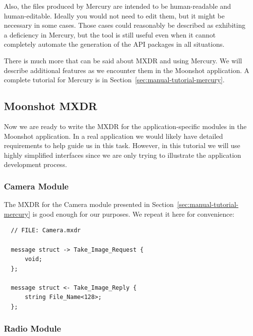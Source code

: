 Also, the files produced by Mercury are intended to be human-readable and human-editable.
Ideally you would not need to edit them, but it might be necessary in some cases. Those cases
could reasonably be described as exhibiting a deficiency in Mercury, but the tool is still
useful even when it cannot completely automate the generation of the API packages in all
situations.

There is much more that can be said about MXDR and using Mercury. We will describe additional
features as we encounter them in the Moonshot application. A complete tutorial for Mercury is in
Section~\ref{sec:manual-tutorial-mercury}.

\subsection{Moonshot MXDR}
\label{sec:manual-tutorial-moonshot-mxdr}

Now we are ready to write the MXDR for the application-specific modules in the Moonshot application.
In a real application we would likely have detailed requirements to help guide us in this task.
However, in this tutorial we will use highly simplified interfaces since we are only trying to
illustrate the application development process.

\subsubsection{Camera Module}

The MXDR for the Camera module presented in Section~\ref{sec:manual-tutorial-mercury} is good
enough for our purposes. We repeat it here for convenience:

\begin{verbatim}
  // FILE: Camera.mxdr

  message struct -> Take_Image_Request {
      void;
  };
  
  message struct <- Take_Image_Reply {
      string File_Name<128>;
  };
\end{verbatim}

\subsubsection{Radio Module}
  


